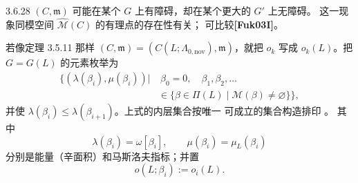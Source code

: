 \begin{remark}{3.6.28}\label{rem:3-6-28}
$(C,\mathfrak m)$ 可能在某个 $G$ 上有障碍，却在某个更大的 $G'$ 上无障碍。
这一现象同模空间 $\widehat{\mathcal M}(C)$ 的有理点的存在性有关；
可比较\textbf{[Fuk03I]}。
\end{remark}

若像定理 3.5.11 那样
$(C,\mathfrak m)=(C(L;\Lambda_{0,\mathrm{nov}}),\mathfrak m)$，就把
$o_k$ 写成 $o_k(L)$。把 $G=G(L)$ 的元素枚举为
\[
\begin{split}
\bigl\{(\lambda(\beta_i),\mu(\beta_i))\mathrel{\big|}
  &\ \beta_0=0,\quad
  \beta_1,\beta_2,\ldots\\
  &\in\{\beta\in\Pi(L)\mid\mathcal M(\beta)\ne\varnothing\}\bigr\},
\end{split}
\]
并使 $\lambda(\beta_i)\leq\lambda(\beta_{i+1})$。上式的内层集合按唯一
可成立的集合构造排印
。
\mbox{其中}
\[
  \lambda(\beta_i)=\omega[\beta_i],
  \qquad
  \mu(\beta_i)=\mu_L(\beta_i)
\]
分别是能量（辛面积）和马斯洛夫指标；并置
\[
  o(L;\beta_i):=o_i(L).
\]
